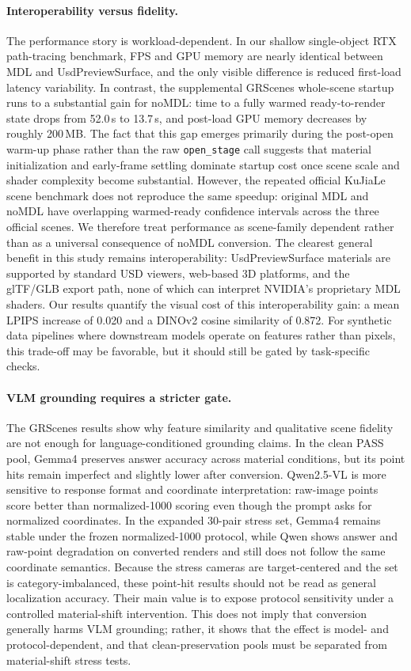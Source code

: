 \paragraph{Interoperability versus fidelity.}
The performance story is workload-dependent. In our shallow single-object RTX
path-tracing benchmark, FPS and GPU memory are nearly identical between MDL and
UsdPreviewSurface, and the only visible difference is reduced first-load
latency variability. In contrast, the supplemental GRScenes whole-scene startup
runs to a substantial gain for noMDL: time to a fully warmed ready-to-render
state drops from 52.0\,s to 13.7\,s, and post-load GPU memory decreases by
roughly 200\,MB. The fact that this gap emerges primarily during the post-open warm-up phase
rather than the raw \texttt{open\_stage} call suggests that material
initialization and early-frame settling dominate startup cost once scene scale
and shader complexity become substantial. However, the repeated official
KuJiaLe scene benchmark does not reproduce the same speedup: original MDL and
noMDL have overlapping warmed-ready confidence intervals across the three
official scenes. We therefore treat performance as scene-family dependent
rather than as a universal consequence of noMDL conversion. The clearest
general benefit in this study remains interoperability: UsdPreviewSurface materials are supported by
standard USD viewers, web-based 3D platforms, and the glTF/GLB export path,
none of which can interpret NVIDIA's proprietary MDL shaders. Our results
quantify the visual cost of this interoperability gain: a mean LPIPS increase
of 0.020 and a DINOv2 cosine similarity of 0.872. For synthetic data pipelines
where downstream models operate on features rather than pixels, this trade-off
may be favorable, but it should still be gated by task-specific checks.

\paragraph{VLM grounding requires a stricter gate.}
The GRScenes results show why feature similarity and qualitative scene fidelity
are not enough for language-conditioned grounding claims. In the clean PASS
pool, Gemma4 preserves answer accuracy across material conditions, but its
point hits remain imperfect and slightly lower after conversion. Qwen2.5-VL is
more sensitive to response format and coordinate interpretation: raw-image
points score better than normalized-1000 scoring even though the prompt asks
for normalized coordinates. In the expanded 30-pair stress set, Gemma4 remains
stable under the frozen normalized-1000 protocol, while Qwen shows answer and
raw-point degradation on converted renders and still does not follow the same
coordinate semantics. Because the stress cameras are target-centered and the
set is category-imbalanced, these point-hit results should not be read as
general localization accuracy. Their main value is to expose protocol
sensitivity under a controlled material-shift intervention. This does not imply
that conversion generally harms VLM grounding; rather, it shows that the effect
is model- and protocol-dependent, and that clean-preservation pools must be
separated from material-shift stress tests.

